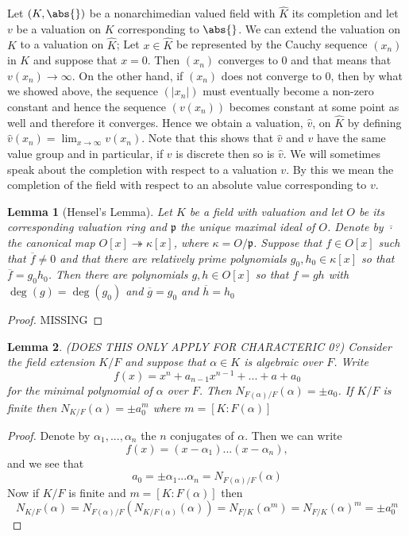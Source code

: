 \documentclass{article}
\newtheorem{lemma}{Lemma}[section]
\newcommand{\mfrak}[1]{\mathfrak{#1}}
\begin{document}
Let $(K, \abs{})$ be a nonarchimedian valued field with $\hat K$ its completion and let $v$ be a valuation on $K$ corresponding to $\abs{}$. We can extend the valuation on $K$ to a valuation on $\hat K$; Let $x \in \hat K$ be represented by the Cauchy sequence $(x_n)$ in $K$ and suppose that $x = 0$. Then $(x_n)$ converges to 0 and that means that $v(x_n) \to \infty$. On the other hand, if $(x_n)$ does not converge to 0, then by what we showed above, the sequence $(|x_n|)$ must eventually become a non-zero constant and hence the sequence $(v(x_n))$ becomes constant at some point as well and therefore it converges. Hence we obtain a valuation, $\hat v$, on $\hat K$ by defining $\hat v(x_n) = \lim_{x \to \infty} v(x_n)$. Note that this shows that $\hat v$ and $v$ have the same value group and in particular, if $v$ is discrete then so is $\hat v$. We will sometimes speak about the completion with respect to a valuation $v$. By this we mean the completion of the field with respect to an absolute value corresponding to $v$. 


\begin{lemma}[Hensel's Lemma]
    Let $K$ be a field with valuation and let $O$ be its corresponding valuation ring and $\mfrak p$ the unique maximal ideal of $O$. Denote by $\overline{\cdot}$ the canonical map $O[x] \twoheadrightarrow \kappa[x]$, where $\kappa = O / \mfrak p$. Suppose that $f \in O[x]$ such that $\overline {f} \neq 0$ and that there are relatively prime polynomials $g_0,h_0 \in \kappa[x]$ so that $\overline f = g_0 h_0$. Then there are polynomials $g,h \in O[x]$ so that $f = gh$ with $\deg(g) = \deg(g_0)$ and $\overline g = g_0$ and $\overline h = h_0$ 
\end{lemma}
\begin{proof}
    MISSING
\end{proof}

\begin{lemma}\label{lem: norm of algebraic number is pm 0th coefficient}
    (DOES THIS ONLY APPLY FOR CHARACTERIC 0?)
    Consider the field extension $K / F$ and suppose that $\alpha \in K$ is algebraic over $F$. Write 
    $$f(x) = x^n + a_{n-1} x^{n-1} + ... + a+a_0$$ 
    for the minimal polynomial of $\alpha$ over $F$. Then $N_{F(\alpha)/F} (\alpha) = \pm a_0$. If $K / F$ is finite then $N_{K / F}(\alpha) = \pm a_0^m$
    where $m = [K : F(\alpha)]$
\end{lemma}
\begin{proof}
    Denote by $\alpha_1, ..., \alpha_n$ the $n$ conjugates of $\alpha$. Then we can write
    $$f(x) = (x-\alpha_1)...(x-\alpha_n),$$
    and we see that
    $$a_0 = \pm \alpha_1 ... \alpha_n = N_{F(\alpha) / F}(\alpha)$$
    Now if $K/F$ is finite and $m = [K : F(\alpha)]$ then
    $$N_{K / F}(\alpha) = N_{F(\alpha) / F}(N_{K / F(\alpha)}(\alpha)) = N_{F / K}(\alpha^m) = N_{F / K}(\alpha)^m = \pm a_0^m$$
\end{proof}
\end{document}
